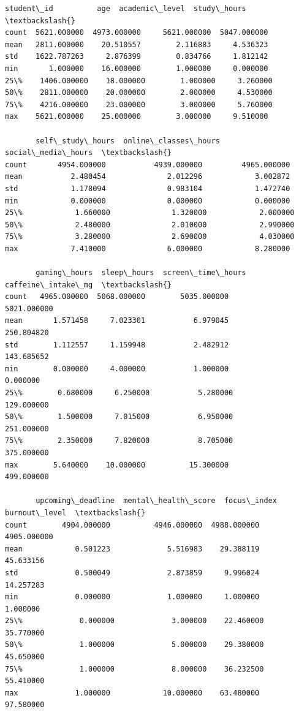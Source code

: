 \documentclass[11pt]{article}
\makeatletter
\newcommand{\boxspacing}{\kern\kvtcb@left@rule\kern\kvtcb@boxsep}
\newcommand{\prompt}[4]{
        {\ttfamily\llap{{\color{#2}[#3]:\hspace{3pt}#4}}\vspace{-\baselineskip}}
    }
\makeatother
\begin{document}
            \begin{tcolorbox}[breakable, size=fbox, boxrule=.5pt, pad at break*=1mm, opacityfill=0]
\prompt{Out}{outcolor}{11}{\boxspacing}
\begin{Verbatim}[commandchars=\\\{\}]
        student\_id          age  academic\_level  study\_hours  \textbackslash{}
count  5621.000000  4973.000000     5621.000000  5047.000000
mean   2811.000000    20.510557        2.116883     4.536323
std    1622.787263     2.876399        0.834766     1.812142
min       1.000000    16.000000        1.000000     0.000000
25\%    1406.000000    18.000000        1.000000     3.260000
50\%    2811.000000    20.000000        2.000000     4.530000
75\%    4216.000000    23.000000        3.000000     5.760000
max    5621.000000    25.000000        3.000000     9.510000

       self\_study\_hours  online\_classes\_hours  social\_media\_hours  \textbackslash{}
count       4954.000000           4939.000000         4965.000000
mean           2.480454              2.012296            3.002872
std            1.178094              0.983104            1.472740
min            0.000000              0.000000            0.000000
25\%            1.660000              1.320000            2.000000
50\%            2.480000              2.010000            2.990000
75\%            3.280000              2.690000            4.030000
max            7.410000              6.000000            8.280000

       gaming\_hours  sleep\_hours  screen\_time\_hours  caffeine\_intake\_mg  \textbackslash{}
count   4965.000000  5068.000000        5035.000000         5021.000000
mean       1.571458     7.023301           6.979045          250.804820
std        1.112557     1.159948           2.482912          143.685652
min        0.000000     4.000000           1.000000            0.000000
25\%        0.680000     6.250000           5.280000          129.000000
50\%        1.500000     7.015000           6.950000          251.000000
75\%        2.350000     7.820000           8.705000          375.000000
max        5.640000    10.000000          15.300000          499.000000

       upcoming\_deadline  mental\_health\_score  focus\_index  burnout\_level  \textbackslash{}
count        4904.000000          4946.000000  4988.000000    4905.000000
mean            0.501223             5.516983    29.388119      45.633156
std             0.500049             2.873859     9.996024      14.257283
min             0.000000             1.000000     1.000000       1.000000
25\%             0.000000             3.000000    22.460000      35.770000
50\%             1.000000             5.000000    29.380000      45.650000
75\%             1.000000             8.000000    36.232500      55.410000
max             1.000000            10.000000    63.480000      97.580000


\end{Verbatim}
\end{tcolorbox}
\end{document}
